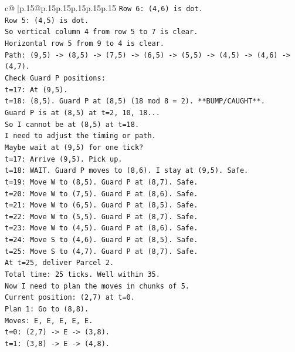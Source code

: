 \documentclass{article}
\begin{document}
{\begin{supertabular}{c@{$\;$}|p{.15\linewidth}@{}p{.15\linewidth}p{.15\linewidth}p{.15\linewidth}p{.15\linewidth}p{.15\linewidth}}
{{{\texttt{Row 6: (4,6) is dot.} \\
\texttt{Row 5: (4,5) is dot.} \\
\texttt{So vertical column 4 from row 5 to 7 is clear.} \\
\texttt{Horizontal row 5 from 9 to 4 is clear.} \\
\texttt{Path: (9,5) {-}> (8,5) {-}> (7,5) {-}> (6,5) {-}> (5,5) {-}> (4,5) {-}> (4,6) {-}> (4,7).} \\
\texttt{Check Guard P positions:} \\
\texttt{t=17: At (9,5).} \\
\texttt{t=18: (8,5). Guard P at (8,5) (18 mod 8 = 2). **BUMP/CAUGHT**.} \\
\texttt{Guard P is at (8,5) at t=2, 10, 18...} \\
\texttt{So I cannot be at (8,5) at t=18.} \\
\texttt{I need to adjust the timing or path.} \\
\texttt{Maybe wait at (9,5) for one tick?} \\
\texttt{t=17: Arrive (9,5). Pick up.} \\
\texttt{t=18: WAIT. Guard P moves to (8,6). I stay at (9,5). Safe.} \\
\texttt{t=19: Move W to (8,5). Guard P at (8,7). Safe.} \\
\texttt{t=20: Move W to (7,5). Guard P at (8,6). Safe.} \\
\texttt{t=21: Move W to (6,5). Guard P at (8,5). Safe.} \\
\texttt{t=22: Move W to (5,5). Guard P at (8,7). Safe.} \\
\texttt{t=23: Move W to (4,5). Guard P at (8,6). Safe.} \\
\texttt{t=24: Move S to (4,6). Guard P at (8,5). Safe.} \\
\texttt{t=25: Move S to (4,7). Guard P at (8,7). Safe.} \\
\texttt{At t=25, deliver Parcel 2.} \\
\texttt{Total time: 25 ticks. Well within 35.} \\
\texttt{Now I need to plan the moves in chunks of 5.} \\
\texttt{Current position: (2,7) at t=0.} \\
\texttt{Plan 1: Go to (8,8).} \\
\texttt{Moves: E, E, E, E, E.} \\
\texttt{t=0: (2,7) {-}> E {-}> (3,8).} \\
\texttt{t=1: (3,8) {-}> E {-}> (4,8).} \\
}}}
\end{supertabular}}
\end{document}
